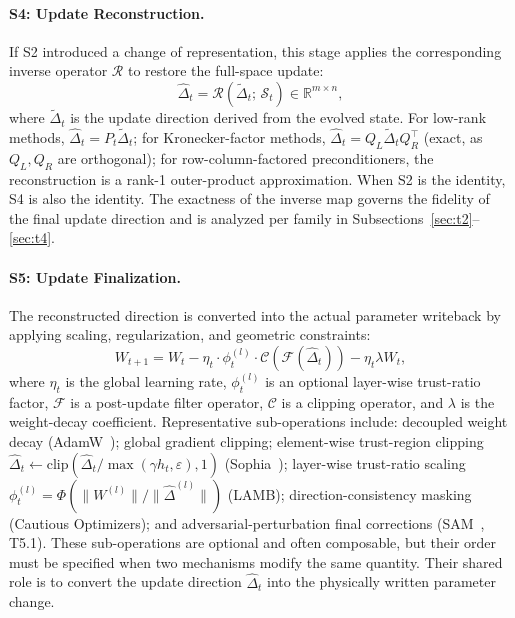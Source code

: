 \paragraph{S4: Update Reconstruction.}
If S2 introduced a change of representation, this stage applies the
corresponding inverse operator $\mathcal{R}$ to restore the full-space update:
\begin{equation}
  \hat{\Delta}_t = \mathcal{R}\!\left(\tilde{\Delta}_t;\,\mathcal{S}_t\right)
  \in \mathbb{R}^{m\times n},
  \label{eq:s4}
\end{equation}
where $\tilde{\Delta}_t$ is the update direction derived from the evolved
state.
For low-rank methods, $\hat{\Delta}_t = P_t\tilde{\Delta}_t$;
for Kronecker-factor methods,
$\hat{\Delta}_t = Q_L\tilde{\Delta}_t Q_R^\top$ (exact, as $Q_L,Q_R$ are
orthogonal); for row-column-factored preconditioners, the reconstruction is a
rank-1 outer-product approximation.
When S2 is the identity, S4 is also the identity.
The exactness of the inverse map governs the fidelity of the final update
direction and is analyzed per family in
Subsections~\ref{sec:t2}--\ref{sec:t4}.

\paragraph{S5: Update Finalization.}
The reconstructed direction is converted into the actual parameter writeback
by applying scaling, regularization, and geometric constraints:
\begin{equation}
  W_{t+1} = W_t
    - \eta_t \cdot \phi_t^{(l)} \cdot
      \mathcal{C}\!\left(\mathcal{F}(\hat{\Delta}_t)\right)
    - \eta_t\lambda W_t,
  \label{eq:s5}
\end{equation}
where $\eta_t$ is the global learning rate, $\phi_t^{(l)}$ is an optional
layer-wise trust-ratio factor, $\mathcal{F}$ is a post-update filter operator,
$\mathcal{C}$ is a clipping operator, and $\lambda$ is the weight-decay
coefficient.
Representative sub-operations include:
decoupled weight decay (AdamW~\cite{loshchilov2019decoupled});
global gradient clipping;
element-wise trust-region clipping
$\hat{\Delta}_t\leftarrow\mathrm{clip}\!\left(\hat{\Delta}_t/
\max(\gamma h_t,\varepsilon),1\right)$
(Sophia~\cite{liu2023sophia});
layer-wise trust-ratio scaling
$\phi_t^{(l)} = \Phi(\|W^{(l)}\|/\|\hat{\Delta}^{(l)}\|)$ (LAMB);
direction-consistency masking (Cautious Optimizers);
and adversarial-perturbation final corrections
(SAM~\cite{foret2021sharpness}, T5.1).
These sub-operations are optional and often composable, but their order must be
specified when two mechanisms modify the same quantity.  Their shared role is
to convert the update direction $\hat{\Delta}_t$ into the physically written
parameter change.

